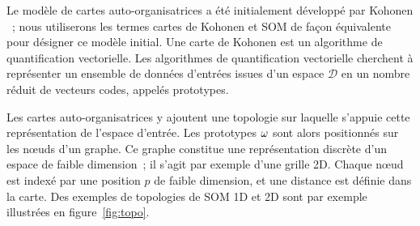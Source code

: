\documentclass[../main]{subfiles}
\begin{document}
Le modèle de cartes auto-organisatrices a été initialement développé par Kohonen \parencite{Kohonen1982}~; nous utiliserons les termes cartes de Kohonen et SOM de façon équivalente pour désigner ce modèle initial.
Une carte de Kohonen est un algorithme de quantification vectorielle. 
Les algorithmes de quantification vectorielle cherchent à représenter un ensemble de données d'entrées issues d'un espace $\mathcal{D}$ en un nombre réduit de vecteurs codes, appelés prototypes.


Les cartes auto-organisatrices y ajoutent une topologie sur laquelle s'appuie cette représentation de l'espace d'entrée. 
Les prototypes $\omega$ sont alors positionnés sur les n\oe{}uds d'un graphe.
Ce graphe constitue une représentation discrète d'un espace de faible dimension~; il s'agit par exemple d'une grille 2D. Chaque n\oe{}ud est indexé par une position $p$ de faible dimension, et une distance est définie dans la carte.
Des exemples de topologies de SOM 1D et 2D sont par exemple illustrées en figure~\ref{fig:topo}.
\end{document}
